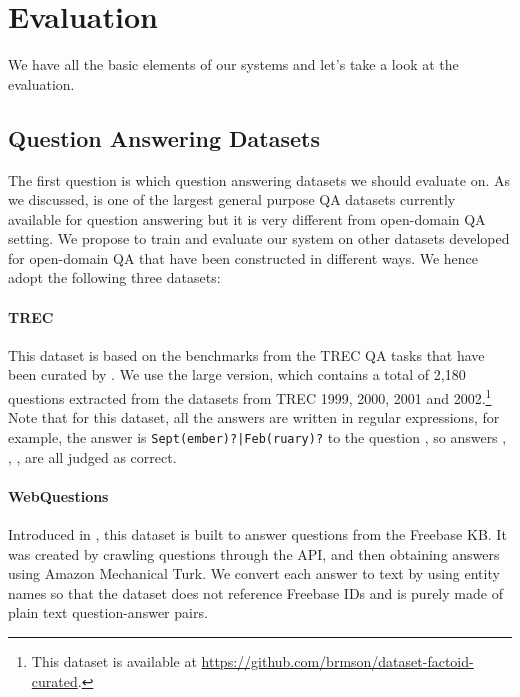 
\section{Evaluation}
\label{sec:drqa-eval}

We have all the basic elements of our  systems and let's take a look at the evaluation.

\subsection{Question Answering Datasets}
The first question is which question answering datasets we should evaluate on. As we discussed,  is one of the largest general purpose QA datasets currently available for question answering but it is very different from open-domain QA setting. We propose to train and evaluate our system on other datasets developed for open-domain QA that have been constructed in different ways. We hence adopt the following three datasets:

\paragraph{TREC} This dataset is based on the benchmarks from the TREC QA tasks that have been curated by . We use the large version, which contains a total of 2,180 questions extracted from the datasets from TREC 1999, 2000, 2001 and 2002.\footnote{This dataset is available at \url{https://github.com/brmson/dataset-factoid-curated}.} Note that for this dataset, all the answers are written in regular expressions, for example, the answer is \texttt{Sept(ember)?|Feb(ruary)?} to the question , so answers , , ,  are all judged as correct.

\paragraph{WebQuestions} Introduced in , this dataset is built to answer questions from the Freebase KB. It was created by crawling questions through the  API, and then obtaining answers using Amazon Mechanical Turk. We convert each answer to text by using entity names so that the dataset does not reference Freebase IDs and is purely made of plain text question-answer pairs.


